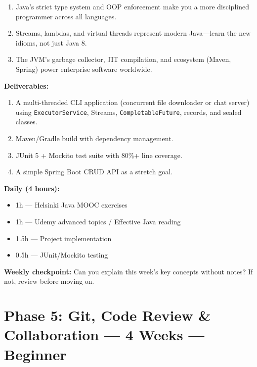 \documentclass[11pt, a4paper, oneside]{report}
\begin{document}
\begin{takeawaybox}
\begin{enumerate}[leftmargin=*]
\item Java's strict type system and OOP enforcement make you a more disciplined programmer across all languages.
\item Streams, lambdas, and virtual threads represent modern Java---learn the new idioms, not just Java 8.
\item The JVM's garbage collector, JIT compilation, and ecosystem (Maven, Spring) power enterprise software worldwide.
\end{enumerate}
\end{takeawaybox}

\begin{milestonebox}
\textbf{Deliverables:}
\begin{enumerate}[leftmargin=*]
\item A multi-threaded CLI application (concurrent file downloader or chat server) using \texttt{ExecutorService}, Streams, \texttt{CompletableFuture}, records, and sealed classes.
\item Maven/Gradle build with dependency management.
\item JUnit 5 + Mockito test suite with 80\%+ line coverage.
\item A simple Spring Boot CRUD API as a stretch goal.
\end{enumerate}
\end{milestonebox}

\begin{practicebox}
\textbf{Daily (4 hours):}
\begin{itemize}[leftmargin=*]
\item 1h --- Helsinki Java MOOC exercises
\item 1h --- Udemy advanced topics / Effective Java reading
\item 1.5h --- Project implementation
\item 0.5h --- JUnit/Mockito testing
\end{itemize}


\textbf{Weekly checkpoint:} Can you explain this week's key concepts without notes? If not, review before moving on.
\end{practicebox}

\clearpage
\section[Phase 5: Git \& Collaboration]{Phase 5: Git, Code Review \& Collaboration --- 4 Weeks --- Beginner}
\end{document}
